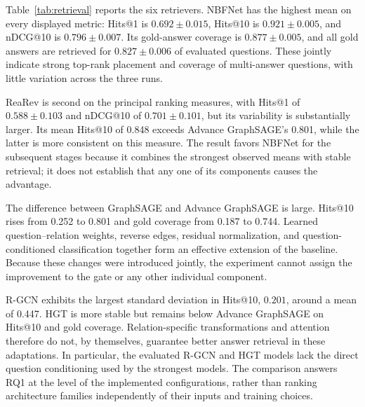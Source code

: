 \documentclass[10pt]{article}
\newcommand{\method}{Advance GraphSAGE}
\begin{document}
Table~\ref{tab:retrieval} reports the six retrievers. NBFNet has the highest mean on every displayed metric: Hits@1 is $0.692\pm0.015$, Hits@10 is $0.921\pm0.005$, and nDCG@10 is $0.796\pm0.007$. Its gold-answer coverage is $0.877\pm0.005$, and all gold answers are retrieved for $0.827\pm0.006$ of evaluated questions. These jointly indicate strong top-rank placement and coverage of multi-answer questions, with little variation across the three runs.

\begin{table}[t]
 \centering
 \caption{Retrieval results on 1,746 questions, mean $\pm$ sample standard deviation across three seeds. RGC is RetrievalGoldCoverage; RFGC is RetrievalFullGoldCoverage. Higher is better for every column. Bold indicates the highest mean, without implying statistical significance.}
 \label{tab:retrieval}
 
\end{table}

ReaRev is second on the principal ranking measures, with Hits@1 of $0.588\pm0.103$ and nDCG@10 of $0.701\pm0.101$, but its variability is substantially larger. Its mean Hits@10 of 0.848 exceeds \method{}'s 0.801, while the latter is more consistent on this measure. The result favors NBFNet for the subsequent stages because it combines the strongest observed means with stable retrieval; it does not establish that any one of its components causes the advantage.

The difference between GraphSAGE and \method{} is large. Hits@10 rises from 0.252 to 0.801 and gold coverage from 0.187 to 0.744. Learned question--relation weights, reverse edges, residual normalization, and question-conditioned classification together form an effective extension of the baseline. Because these changes were introduced jointly, the experiment cannot assign the improvement to the gate or any other individual component.

R-GCN exhibits the largest standard deviation in Hits@10, $0.201$, around a mean of 0.447. HGT is more stable but remains below \method{} on Hits@10 and gold coverage. Relation-specific transformations and attention therefore do not, by themselves, guarantee better answer retrieval in these adaptations. In particular, the evaluated R-GCN and HGT models lack the direct question conditioning used by the strongest models. The comparison answers RQ1 at the level of the implemented configurations, rather than ranking architecture families independently of their inputs and training choices.
\end{document}
